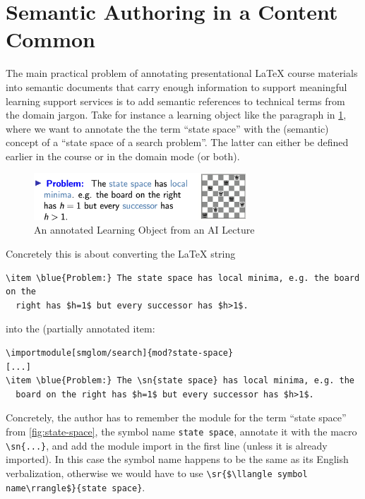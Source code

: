 \documentclass{llncs}
\def\llangle{\langle\kern-.2em\langle}
\def\rrangle{\rangle\kern-.2em\rangle}
\begin{document}
\section{Semantic Authoring in a Content Common}

The main practical problem of annotating presentational {\LaTeX} course materials into
semantic documents that carry enough information to support meaningful learning support
services is to add semantic references to technical terms from the domain jargon. Take for
instance a learning object like the paragraph in \cref{fig:lo}, where we want to annotate
the the term ``state space'' with the (semantic) concept of a ``state space of a search
problem''. The latter can either be defined earlier in the course or in the domain mode
(or both).

\begin{figure}[ht]\centering
  \includegraphics[width=8cm]{problem}
  \caption{An annotated Learning Object from an AI Lecture}\label{fig:lo}
\end{figure}

Concretely this is about converting the {\LaTeX} string
\begin{lstlisting}[language={[LaTeX]TeX}]
\item \blue{Problem:} The state space has local minima, e.g. the board on the
  right has $h=1$ but every successor has $h>1$. 
\end{lstlisting}
into the (partially annotated item:  
\begin{lstlisting}[language={[LaTeX]TeX},morekeywords={sn,importmodule}]
\importmodule[smglom/search]{mod?state-space}
[...]  
\item \blue{Problem:} The \sn{state space} has local minima, e.g. the
  board on the right has $h=1$ but every successor has $h>1$. 
\end{lstlisting}
Concretely, the author has to remember the module for the term ``state space'' from
\cref{fig:state-space}, the symbol name \lstinline|state space|, annotate it with the
\sTeX macro \lstinline|\sn{...}|, and add the module import in the first line (unless it
is already imported). In this case the symbol name happens to be the same as its English
verbalization, otherwise we would have to use
\lstinline[mathescape]|\sr{$\llangle symbol name\rrangle$}{state space}|.
\end{document}
